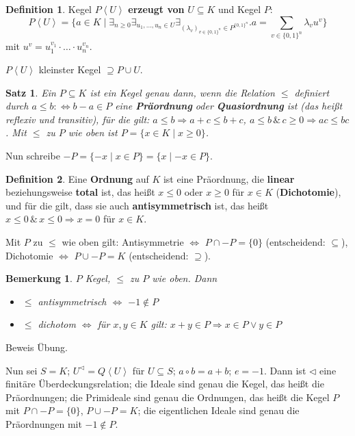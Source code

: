 \documentclass[headsepline=true,DIV=11]{scrartcl}
\newtheorem*{theorem}{Satz}
\newtheorem*{remark}{Bemerkung}
\theoremstyle{definition}
\newtheorem*{definition}{Definition}
\begin{document}
\begin{definition}
  Kegel $P\left< U\right>$ {\bf erzeugt von} $U\subseteq K$ und Kegel $P$:
  $$ P\left< U\right>=\{a\in K\mid \exists_{n\ge 0}\exists_{u_1,\ldots,u_n\in U}\exists_{(\lambda_v)_{v\in\{0,1\}^n}\in
    P^{\{0,1\}^n}}. a=\sum\limits_{v\in\{0,1\}^n}\lambda_v u^v\} $$
  mit $u^v = u_1^{v_1}\cdot\ldots\cdot u_n^{v_n}$.

  $P\left< U\right>$ kleinster Kegel $\supseteq P\cup U$.
\end{definition}

\begin{theorem}
  Ein $P\subseteq K$ ist ein Kegel genau dann, wenn die Relation $\le$ definiert durch $a\le b :\Leftrightarrow b-a\in P$ eine {\bf Präordnung} oder
  {\bf Quasiordnung} ist (das heißt reflexiv und transitiv), für die gilt: $a\le b\Rightarrow a+c\le b+c$, $a\le b \, \& \, c\ge 0\Rightarrow ac\le
  bc$. Mit $\le$ zu $P$ wie oben ist $P=\{x\in K\mid x\ge 0\}$.
\end{theorem}

Nun schreibe $-P = \{-x\mid x\in P\}=\{x\mid -x\in P\}$.

\begin{definition}
  Eine {\bf Ordnung} auf $K$ ist eine Präordnung, die {\bf linear} beziehungsweise {\bf total} ist, das heißt $x\le 0$ oder $x\ge 0$ für $x\in K$
  ({\bf Dichotomie}), und für die gilt, dass sie auch {\bf antisymmetrisch} ist, das heißt $x\le 0\,\&\,x\le 0\Rightarrow x=0$ für $x\in K$.
\end{definition}

Mit $P$ zu $\le$ wie oben gilt: Antisymmetrie $\Leftrightarrow$ $P\cap -P=\{0\}$ (entscheidend: $\subseteq$), Dichotomie $\Leftrightarrow$ $P\cup -P =
K$ (entscheidend: $\supseteq$).

\begin{remark}
  $P$ Kegel, $\le$ zu $P$ wie oben. Dann
  \begin{itemize}
  \item $\le$ antisymmetrisch $\Leftrightarrow$ $-1\not\in P$
  \item $\le$ dichotom $\Leftrightarrow$ für $x,y\in K$ gilt: $x+y\in P\Rightarrow x\in P \vee y\in P$
  \end{itemize}
\end{remark}

Beweis Übung.

Nun sei $S=K$; $U^\lhd=Q\left<U\right>$ für $U\subseteq S$; $a\circ b = a+b$; $e=-1$. Dann ist $\lhd$ eine finitäre Überdeckungsrelation; die Ideale
sind genau die Kegel, das heißt die Präordnungen; die Primideale sind genau die Ordnungen, das heißt die Kegel $P$ mit $P\cap -P=\{0\}$, $P\cup -P=K$;
die eigentlichen Ideale sind genau die Präordnungen mit $-1\not\in P$.
\end{document}

